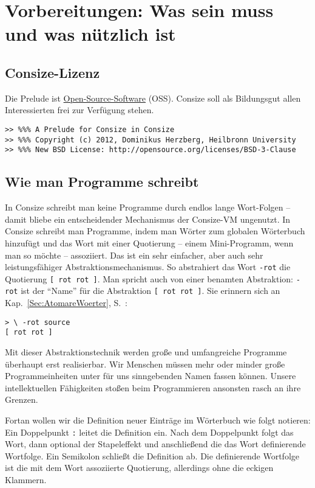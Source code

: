 \section{Vorbereitungen: Was sein muss und was nützlich ist}

\subsection{Consize-Lizenz}

Die Prelude ist \href{http://de.wikipedia.org/wiki/Open_source}{Open-Source-Software} (OSS). Consize soll als Bildungsgut allen Interessierten frei zur Verfügung stehen.

\begin{verbatim}
>> %%% A Prelude for Consize in Consize
>> %%% Copyright (c) 2012, Dominikus Herzberg, Heilbronn University
>> %%% New BSD License: http://opensource.org/licenses/BSD-3-Clause
\end{verbatim}

\subsection{Wie man Programme schreibt}
\label{Sec:LoadBootimage}

In Consize schreibt man keine Programme durch endlos lange Wort-Folgen -- damit bliebe ein entscheidender Mechanismus der Consize-VM ungenutzt. In Consize schreibt man Programme, indem man Wörter zum globalen Wörterbuch hinzufügt und das Wort mit einer Quotierung -- einem Mini-Programm, wenn man so möchte -- assoziiert. Das ist ein sehr einfacher, aber auch sehr leistungsfähiger Abstraktionsmechanismus. So abstrahiert das Wort \verb|-rot| die Quotierung \verb|[ rot rot ]|. Man spricht auch von einer benamten Abstraktion: \verb|-rot| ist der "`Name"' für die Abstraktion \verb|[ rot rot ]|. Sie erinnern sich an Kap.~\ref{Sec:AtomareWoerter}, S.~\pageref{rotsource}:

\begin{verbatim}
> \ -rot source
[ rot rot ]

\end{verbatim}

Mit dieser Abstraktionstechnik werden große und umfangreiche Programme überhaupt erst realisierbar. Wir Menschen müssen mehr oder minder große Programmeinheiten unter für uns sinngebenden Namen fassen können. Unsere intellektuellen Fähigkeiten stoßen beim Programmieren ansonsten rasch an ihre Grenzen.

Fortan wollen wir die Definition neuer Einträge im Wörterbuch wie folgt notieren: Ein Doppelpunkt \verb|:| leitet die Definition ein. Nach dem Doppelpunkt folgt das Wort, dann optional der Stapeleffekt und anschließend die das Wort definierende Wortfolge. Ein Semikolon schließt die Definition ab. Die definierende Wortfolge ist die mit dem Wort assoziierte Quotierung, allerdings ohne die eckigen Klammern.


